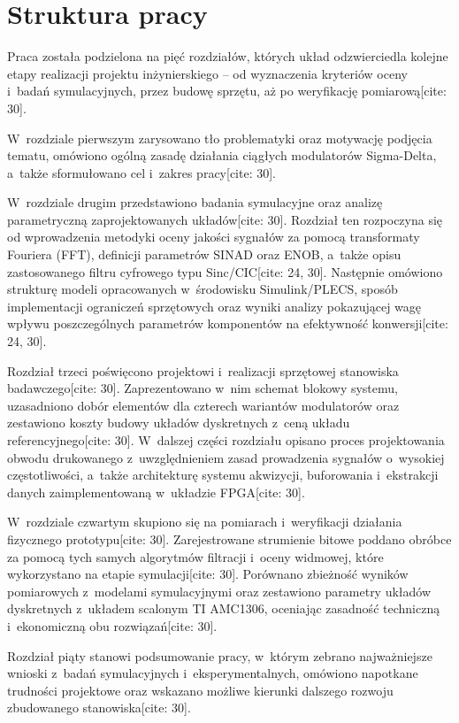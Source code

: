 \section{Struktura pracy}
\label{sec:struktura_pracy}

Praca została podzielona na pięć rozdziałów, których układ odzwierciedla kolejne etapy realizacji projektu inżynierskiego -- od wyznaczenia kryteriów oceny i~badań symulacyjnych, przez budowę sprzętu, aż po weryfikację pomiarową[cite: 30].

W~rozdziale pierwszym zarysowano tło problematyki oraz motywację podjęcia tematu, omówiono ogólną zasadę działania ciągłych modulatorów Sigma-Delta, a~także sformułowano cel i~zakres pracy[cite: 30].

W~rozdziale drugim przedstawiono badania symulacyjne oraz analizę parametryczną zaprojektowanych układów[cite: 30]. Rozdział ten rozpoczyna się od wprowadzenia metodyki oceny jakości sygnałów za pomocą transformaty Fouriera (FFT), definicji parametrów SINAD oraz ENOB, a~także opisu zastosowanego filtru cyfrowego typu Sinc/CIC[cite: 24, 30]. Następnie omówiono strukturę modeli opracowanych w~środowisku Simulink/PLECS, sposób implementacji ograniczeń sprzętowych oraz wyniki analizy pokazującej wagę wpływu poszczególnych parametrów komponentów na efektywność konwersji[cite: 24, 30].

Rozdział trzeci poświęcono projektowi i~realizacji sprzętowej stanowiska badawczego[cite: 30]. Zaprezentowano w~nim schemat blokowy systemu, uzasadniono dobór elementów dla czterech wariantów modulatorów oraz zestawiono koszty budowy układów dyskretnych z~ceną układu referencyjnego[cite: 30]. W~dalszej części rozdziału opisano proces projektowania obwodu drukowanego z~uwzględnieniem zasad prowadzenia sygnałów o~wysokiej częstotliwości, a~także architekturę systemu akwizycji, buforowania i~ekstrakcji danych zaimplementowaną w~układzie FPGA[cite: 30].

W~rozdziale czwartym skupiono się na pomiarach i~weryfikacji działania fizycznego prototypu[cite: 30]. Zarejestrowane strumienie bitowe poddano obróbce za pomocą tych samych algorytmów filtracji i~oceny widmowej, które wykorzystano na etapie symulacji[cite: 30]. Porównano zbieżność wyników pomiarowych z~modelami symulacyjnymi oraz zestawiono parametry układów dyskretnych z~układem scalonym TI AMC1306, oceniając zasadność techniczną i~ekonomiczną obu rozwiązań[cite: 30].

Rozdział piąty stanowi podsumowanie pracy, w~którym zebrano najważniejsze wnioski z~badań symulacyjnych i~eksperymentalnych, omówiono napotkane trudności projektowe oraz wskazano możliwe kierunki dalszego rozwoju zbudowanego stanowiska[cite: 30].